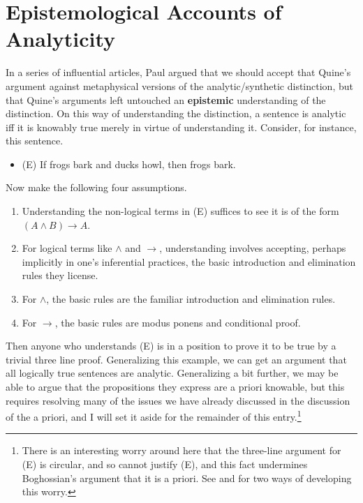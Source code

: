 \section{Epistemological Accounts of Analyticity}
\label{epistemologicalaccountsofanalyticity}

In a series of influential articles, Paul \citet{Boghossian1996-BOGAR, Boghossian1997, Boghossian2003-BOGEAA} argued that we should accept that Quine's argument against metaphysical versions of the analytic\slash synthetic distinction, but that Quine's arguments left untouched an \textbf{epistemic} understanding of the distinction. On this way of understanding the distinction, a sentence is analytic iff it is knowably true merely in virtue of understanding it. Consider, for instance, this sentence.

\begin{itemize}
\item (E) If frogs bark and ducks howl, then frogs bark.

\end{itemize}
Now make the following four assumptions.

\begin{enumerate}
\item Understanding the non-logical terms in (E) suffices to see it is of the form $(A \wedge B) \rightarrow A$.

\item For logical terms like $\wedge$ and $\rightarrow$, understanding involves accepting, perhaps implicitly in one's inferential practices, the basic introduction and elimination rules they license.

\item For $\wedge$, the basic rules are the familiar introduction and elimination rules.

\item For $\rightarrow$, the basic rules are modus ponens and conditional proof.

\end{enumerate}
Then anyone who understands (E) is in a position to prove it to be true by a trivial three line proof. Generalizing this example, we can get an argument that all logically true sentences are analytic. Generalizing a bit further, we may be able to argue that the propositions they express are a priori knowable, but this requires resolving many of the issues we have already discussed in the discussion of the a priori, and I will set it aside for the remainder of this entry.\footnote{There is an interesting worry around here that the three-line argument for (E) is circular, and so cannot justify (E), and this fact undermines Boghossian's argument that it is a priori. See  \citet{Ebert2005} and  \citet{Jenkins2008-JENBAE} for two ways of developing this worry.}

